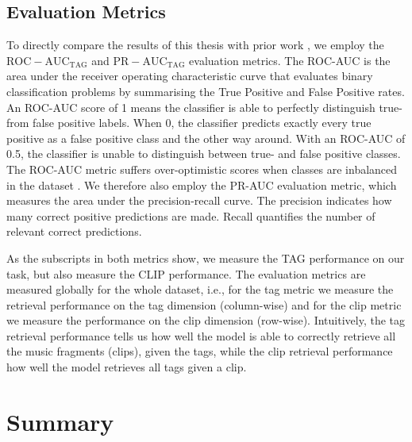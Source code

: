 \subsection{Evaluation Metrics}
To directly compare the results of this thesis with prior work \cite{dieleman2014end,lee2018samplecnn,pons_end--end_2017}, we employ the $\mathrm{ROC-AUC}_{\mathrm{TAG}}$ and $\mathrm{PR-AUC}_{\mathrm{TAG}}$ evaluation metrics. The ROC-AUC is the area under the receiver operating characteristic curve that evaluates binary classification problems by summarising the True Positive and False Positive rates. An ROC-AUC score of 1 means the classifier is able to perfectly distinguish true- from false positive labels. When 0, the classifier predicts exactly every true positive as a false positive class and the other way around. With an ROC-AUC of 0.5, the classifier is unable to distinguish between true- and false positive classes. The ROC-AUC metric suffers over-optimistic scores when classes are inbalanced in the dataset \cite{rocaucimbalance}. We therefore also employ the PR-AUC evaluation metric, which measures the area under the precision-recall curve. The precision indicates how many correct positive predictions are made. Recall quantifies the number of relevant correct predictions.

As the subscripts in both metrics show, we measure the TAG performance on our task, but also measure the CLIP performance. The evaluation metrics are measured globally for the whole dataset, i.e., for the tag metric we measure the retrieval performance on the tag dimension (column-wise) and for the clip metric we measure the performance on the clip dimension (row-wise). Intuitively, the tag retrieval performance tells us how well the model is able to correctly retrieve all the music fragments (clips), given the tags, while the clip retrieval performance how well the model retrieves all tags given a clip.

\section*{Summary}
